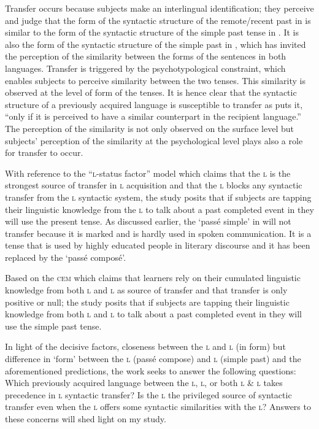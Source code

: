 \documentclass[output=paper,
modfonts
]{langscibook}
\begin{document}
Transfer occurs because subjects make an interlingual identification; they perceive and judge that the form of the syntactic structure of the remote/recent past in  is similar to the form of the syntactic structure of the simple past tense in . It is also the form of the syntactic structure of the simple past in , which has invited the perception of the similarity between the forms of the sentences in both languages. Transfer is triggered by the psychotypological constraint, which enables subjects to perceive similarity between the two tenses. This similarity is observed at the level of form of the tenses. It is hence clear that the syntactic structure of a previously acquired language is susceptible to transfer as \citet[174]{Jarvis2010} puts it, “only if it is perceived to have a similar counterpart in the recipient language.” The perception of the similarity is not only observed on the surface level but subjects’ perception of the similarity at the psychological level plays also a role for transfer to occur.  

With reference to the “\textsc{l}-status factor” model which claims that the \textsc{l} is the strongest source of transfer in \textsc{l} acquisition and that the \textsc{l} blocks any syntactic transfer from the \textsc{l} syntactic system, the study posits that if subjects are tapping their linguistic knowledge from the \textsc{l} to talk about a past completed event in  they will use the present  tense. As discussed earlier, the ‘passé simple’ in  will not transfer because it is marked and is hardly used in spoken communication. It is a tense that is used by highly educated people in literary discourse and it has been replaced by the ‘passé composé’.

Based on the \textsc{cem} which claims that learners rely on their cumulated linguistic knowledge from both \textsc{l} and \textsc{l} as source of transfer and that transfer is only positive or null; the study posits that if subjects are tapping their linguistic knowledge from both \textsc{l} and \textsc{l} to talk about a past completed event in  they will use the simple past tense.

In light of the decisive factors, closeness between the \textsc{l}  and \textsc{l}  (in form) but difference in ‘form’ between the \textsc{l} (passé compose) and \textsc{l} (simple past) and the aforementioned predictions, the work seeks to answer the following questions: Which previously acquired language between the \textsc{l}, \textsc{l}, or both \textsc{l} \& \textsc{l} takes precedence in \textsc{l} syntactic transfer? Is the \textsc{l} the privileged source of syntactic transfer even when the \textsc{l} offers some syntactic similarities with the \textsc{l}? Answers to these concerns will shed light on my study.
\end{document}

